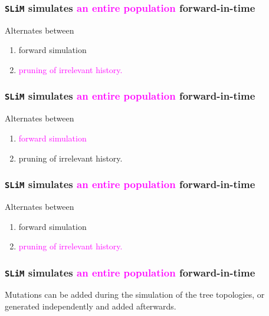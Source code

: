\documentclass[11pt, mathserif, aspectratio=169]{beamer}
\newcommand{\magenta}[1]{\textcolor{magenta}{#1}}
\begin{document}
\begin{frame}
\frametitle{\texttt{SLiM} simulates \magenta{an entire population} forward-in-time}
\begin{minipage}{.58\textwidth}

\end{minipage}\hfill
\begin{minipage}{.4\textwidth}
Alternates between
\begin{enumerate}
\item forward simulation
\item \magenta{pruning of irrelevant history.}
\end{enumerate}
\end{minipage}
\end{frame}

\begin{frame}
\frametitle{\texttt{SLiM} simulates \magenta{an entire population} forward-in-time}
\begin{minipage}{.58\textwidth}

\end{minipage}\hfill
\begin{minipage}{.4\textwidth}
Alternates between
\begin{enumerate}
\item \magenta{forward simulation}
\item pruning of irrelevant history.
\end{enumerate}
\end{minipage}
\end{frame}

\begin{frame}
\frametitle{\texttt{SLiM} simulates \magenta{an entire population} forward-in-time}
\begin{minipage}{.58\textwidth}

\end{minipage}\hfill
\begin{minipage}{.4\textwidth}
Alternates between
\begin{enumerate}
\item forward simulation
\item \magenta{pruning of irrelevant history.}
\end{enumerate}
\end{minipage}
\end{frame}

\begin{frame}
\frametitle{\texttt{SLiM} simulates \magenta{an entire population} forward-in-time}
\begin{minipage}{.58\textwidth}

\end{minipage}\hfill
\begin{minipage}{.4\textwidth}
Mutations can be added during the simulation of the tree topologies, or generated independently and added afterwards.
\end{minipage}
\end{frame}
\end{document}
